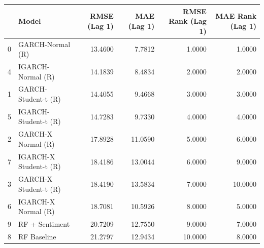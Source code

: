 \begin{table}[htbp]
\centering
\begin{tabular}{llrrrr}
\toprule
 & Model & RMSE (Lag 1) & MAE (Lag 1) & RMSE Rank (Lag 1) & MAE Rank (Lag 1) \\
\midrule
0 & GARCH-Normal (R) & 13.4600 & 7.7812 & 1.0000 & 1.0000 \\
4 & IGARCH-Normal (R) & 14.1839 & 8.4834 & 2.0000 & 2.0000 \\
1 & GARCH-Student-t (R) & 14.4055 & 9.4668 & 3.0000 & 3.0000 \\
5 & IGARCH-Student-t (R) & 14.7283 & 9.7330 & 4.0000 & 4.0000 \\
2 & GARCH-X Normal (R) & 17.8928 & 11.0590 & 5.0000 & 6.0000 \\
7 & IGARCH-X Student-t (R) & 18.4186 & 13.0044 & 6.0000 & 9.0000 \\
3 & GARCH-X Student-t (R) & 18.4190 & 13.5834 & 7.0000 & 10.0000 \\
6 & IGARCH-X Normal (R) & 18.7081 & 10.5926 & 8.0000 & 5.0000 \\
9 & RF + Sentiment & 20.7209 & 12.7550 & 9.0000 & 7.0000 \\
8 & RF Baseline & 21.2797 & 12.9434 & 10.0000 & 8.0000 \\
\bottomrule
\end{tabular}
\label{tab:robustness_sentiment_lag}
\end{table}
